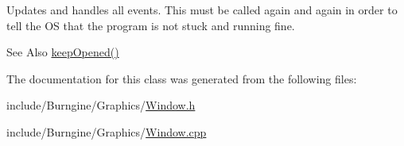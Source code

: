 Updates and handles all events. This must be called again and again in order to tell the O\-S that the program is not stuck and running fine. 

\begin{DoxySeeAlso}{See Also}
\hyperlink{classburn_1_1_window_aefd7af7009fee4982b04ac946540f7ee}{keep\-Opened()} 
\end{DoxySeeAlso}


The documentation for this class was generated from the following files\-:\begin{DoxyCompactItemize}
\item 
include/\-Burngine/\-Graphics/\hyperlink{_window_8h}{Window.\-h}\item 
include/\-Burngine/\-Graphics/\hyperlink{_window_8cpp}{Window.\-cpp}\end{DoxyCompactItemize}
